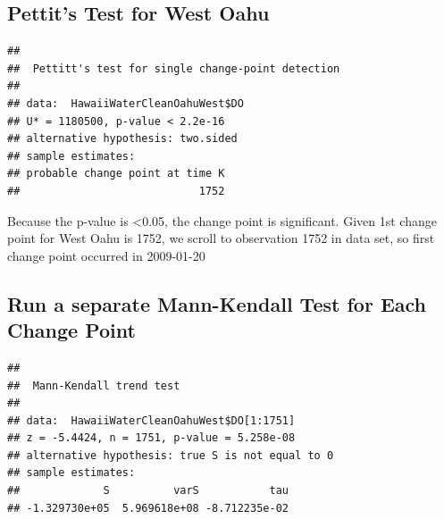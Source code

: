 \documentclass[12pt,]{article}
\newenvironment{Shaded}{\begin{snugshade}}{\end{snugshade}}
\newcommand{\KeywordTok}[1]{\textcolor[rgb]{0.13,0.29,0.53}{\textbf{#1}}}
\newcommand{\DecValTok}[1]{\textcolor[rgb]{0.00,0.00,0.81}{#1}}
\newcommand{\OperatorTok}[1]{\textcolor[rgb]{0.81,0.36,0.00}{\textbf{#1}}}
\newcommand{\NormalTok}[1]{#1}
\begin{document}
\subsection{Pettit's Test for West
Oahu}\label{pettits-test-for-west-oahu}

\begin{Shaded}
\end{Shaded}

\begin{verbatim}
## 
##  Pettitt's test for single change-point detection
## 
## data:  HawaiiWaterCleanOahuWest$DO
## U* = 1180500, p-value < 2.2e-16
## alternative hypothesis: two.sided
## sample estimates:
## probable change point at time K 
##                            1752
\end{verbatim}

Because the p-value is \textless{}0.05, the change point is significant.
Given 1st change point for West Oahu is 1752, we scroll to observation
1752 in data set, so first change point occurred in 2009-01-20

\subsection{Run a separate Mann-Kendall Test for Each Change
Point}\label{run-a-separate-mann-kendall-test-for-each-change-point-2}

\begin{Shaded}
\end{Shaded}

\begin{verbatim}
## 
##  Mann-Kendall trend test
## 
## data:  HawaiiWaterCleanOahuWest$DO[1:1751]
## z = -5.4424, n = 1751, p-value = 5.258e-08
## alternative hypothesis: true S is not equal to 0
## sample estimates:
##             S          varS           tau 
## -1.329730e+05  5.969618e+08 -8.712235e-02
\end{verbatim}

\begin{Shaded}
\end{Shaded}
\end{document}
